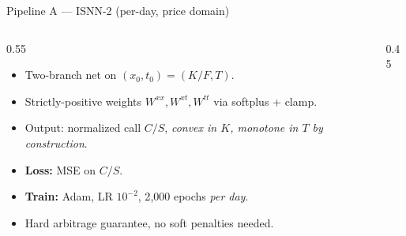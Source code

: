 \documentclass[10pt,aspectratio=169]{beamer}
\begin{document}
\begin{frame}{Pipeline A --- ISNN-2 (per-day, price domain)}
\begin{columns}[T,onlytextwidth]
\begin{column}{0.55\linewidth}
\begin{itemize}\small
  \item Two-branch net on $(x_0, t_0) = (K/F, T)$.
  \item Strictly-positive weights $W^{xx}, W^{xt}, W^{tt}$ via softplus + clamp.
  \item Output: normalized call $C/S$, \emph{convex in $K$, monotone in $T$ by construction}.
  \item \textbf{Loss:} MSE on $C/S$.
  \item \textbf{Train:} Adam, LR $10^{-2}$, 2{,}000 epochs \emph{per day}.
  \item Hard arbitrage guarantee, no soft penalties needed.
\end{itemize}
\end{column}
\begin{column}{0.45\linewidth}
\centering
{}
\end{column}
\end{columns}
\end{frame}
\end{document}
